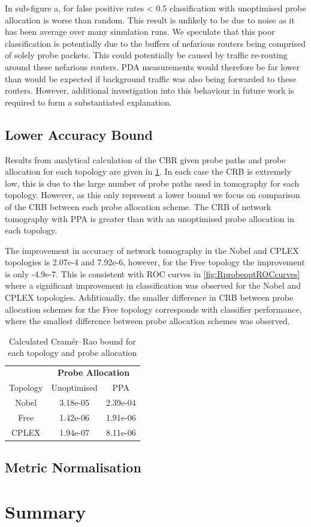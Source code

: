 In sub-figure a, for false positive rates < 0.5 classification with unoptimised probe allocation is worse than random. This result is unlikely to be due to noise as it has been average over many simulation runs. We speculate that this poor classification is potentially due to the buffers of nefarious routers being comprised of solely probe packets. This could potentially be caused by traffic re-routing around these nefarious routers. PDA measurements would therefore be far lower than would be expected if background traffic was also being forwarded to these routers. However, additional investigation into this behaviour in future work is required to form a substantiated explanation.

\subsection{Lower Accuracy Bound}
\label{ssec:Rloweraccuracybounds}
Results from analytical calculation of the CBR given probe paths and probe allocation for each topology are given in \cref{tbl:crbs}. In each case the CRB is extremely low, this is due to the large number of probe paths used in tomography for each topology. However, as this only represent a lower bound we focus on comparison of the CRB between each probe allocation scheme. The CRB of network tomography with PPA is greater than with an unoptimised probe allocation in each topology.\par
The improvement in accuracy of network tomography in the Nobel and CPLEX topologies is 2.07e-4 and 7.92e-6, however, for the Free topology the improvement is only -4.9e-7. This is consistent with ROC curves in \cref{fig:RprobeoptROCcurves} where a significant improvement in classification was observed for the Nobel and CPLEX topologies. Additionally, the smaller difference in CRB between probe allocation schemes for the Free topology corresponds with classifier performance, where the smallest difference between probe allocation schemes was observed.

\begin{table}[H]
 \centering
  \begin{tabular}{@{}ccc@{}}
   \toprule
    &\multicolumn{2}{c}{\textbf{Probe Allocation}}\\
    \cmidrule(rl){2-3}
    Topology & Unoptimised & PPA \\
    \midrule
    Nobel & 3.18e-05 & 2.39e-04\\
    Free & 1.42e-06 & 1.91e-06\\
    CPLEX & 1.94e-07 & 8.11e-06\\
   \bottomrule
  \end{tabular}
  \caption{Calculated Cramér–Rao bound for each topology and probe allocation}
  \label{tbl:crbs}
\end{table}

\subsection{Metric Normalisation}
\label{ssec:Rmetricnormilisation}


\section{Summary}
